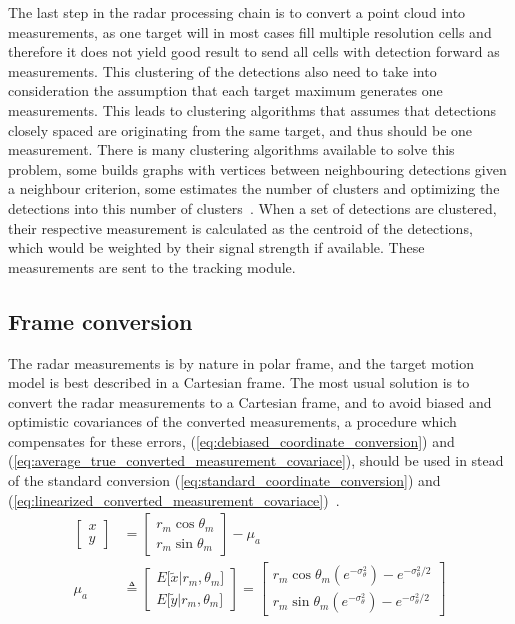 The last step in the radar processing chain is to convert a point cloud into measurements, as one target will in most cases fill multiple resolution cells and therefore it does not yield good result to send all cells with detection forward as measurements. This clustering of the detections also need to take into consideration the assumption that each target maximum generates one measurements. This leads to clustering algorithms that assumes that detections closely spaced are originating from the same target, and thus should be one measurement. There is many clustering algorithms available to solve this problem, some builds graphs with vertices between neighbouring detections given a neighbour criterion, some estimates the number of clusters and optimizing the detections into this number of clusters~\cite{Mahmuddin2010,Pelleg2000}. When a set of detections are clustered, their respective measurement is calculated as the centroid of the detections, which would be weighted by their signal strength if available. These measurements are sent to the tracking module.

\subsection{Frame conversion}\label{subsec:frame_conversion}
The radar measurements is by nature in polar frame, and the target motion model is best described in a Cartesian frame. The most usual solution is to convert the radar measurements to a Cartesian frame, and to avoid biased and optimistic covariances of the converted measurements, a procedure which compensates for these errors, (\ref{eq:debiased_coordinate_conversion}) and (\ref{eq:average_true_converted_measurement_covariace}),  should be used in stead of the standard conversion (\ref{eq:standard_coordinate_conversion}) and (\ref{eq:linearized_converted_measurement_covariace})~\cite{Bar-Shalom1995}.
\begin{equation}\label{eq:debiased_coordinate_conversion}
\begin{split}
\begin{bmatrix} x \\ y \end{bmatrix} &= \begin{bmatrix} r_m \cos \theta_m  \\ r_m \sin \theta_m  \end{bmatrix} - \mu_a \\
\mu_a & \triangleq 
\begin{bmatrix}
	E \lbrack \tilde{x}|r_m,\theta_m \rbrack \\ 
	E \lbrack \tilde{y}|r_m,\theta_m \rbrack 
\end{bmatrix} 
= 
\begin{bmatrix}
	r_m \cos \theta_m (e^{-\sigma^2_\theta}) - e^{-\sigma^2_\theta / 2} \\ 
	r_m \sin \theta_m (e^{-\sigma^2_\theta}) - e^{-\sigma^2_\theta / 2}
\end{bmatrix} 
\end{split}
\end{equation}

